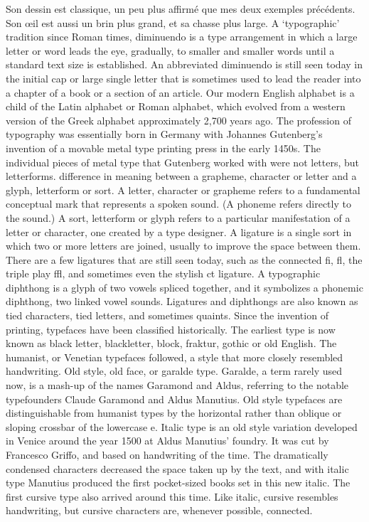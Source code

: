 \documentclass[12pt,a4paper,twocolumn]{book} %
\begin{document}
Son dessin est classique, un peu plus affirmé que mes deux exemples précédents. Son œil est aussi un brin plus grand, et sa chasse plus large.
A ‘typographic’ tradition since Roman times, diminuendo is a type arrangement in which a large letter or word leads the eye, gradually, to smaller and smaller words until a standard text size is established. An abbreviated diminuendo is still seen today in the initial cap or large single letter that is sometimes used to lead the reader into a chapter of a book or a section of an article.
Our modern English alphabet is a child of the Latin alphabet or Roman alphabet, which evolved from a western version of the Greek alphabet approximately 2,700 years ago. The profession of typography was essentially born in Germany with Johannes Gutenberg’s invention of a movable metal type printing press in the early 1450s. The individual pieces of metal type that Gutenberg worked with were not letters, but letterforms.
difference in meaning between a grapheme, character or letter and a glyph, letterform or sort. A letter, character or grapheme refers to a fundamental conceptual mark that represents a spoken sound. (A phoneme refers directly to the sound.) A sort, letterform or glyph refers to a particular manifestation of a letter or character, one created by a type designer.
A ligature is a single sort in which two or more letters are joined, usually to improve the space between them. There are a few ligatures that are still seen today, such as the connected fi, fl, the triple play ffl, and sometimes even the stylish ct ligature. A typographic diphthong is a glyph of two vowels spliced together, and it symbolizes a phonemic diphthong, two linked vowel sounds. Ligatures and diphthongs are also known as tied characters, tied letters, and sometimes quaints.
Since the invention of printing, typefaces have been classified historically. The earliest type is now known as black letter, blackletter, block, fraktur, gothic or old English. The humanist, or Venetian typefaces followed, a style that more closely resembled handwriting. Old style, old face, or garalde type. Garalde, a term rarely used now, is a mash-up of the names Garamond and Aldus, referring to the notable typefounders Claude Garamond and Aldus Manutius. Old style typefaces are distinguishable from humanist types by the horizontal rather than oblique or sloping crossbar of the lowercase e.
Italic type is an old style variation developed in Venice around the year 1500 at Aldus Manutius’ foundry. It was cut by Francesco Griffo, and based on handwriting of the time. The dramatically condensed characters decreased the space taken up by the text, and with italic type Manutius produced the first pocket-sized books set in this new italic. The first cursive type also arrived around this time. Like italic, cursive resembles handwriting, but cursive characters are, whenever possible, connected.
\end{document}
